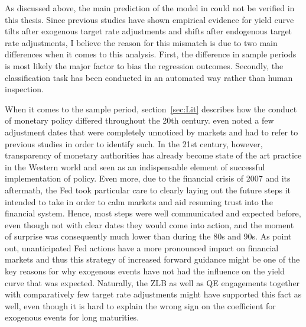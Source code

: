 
As discussed above, the main prediction of the model in \textcite{Ellingsen.2001} could not be verified in this thesis. Since previous studies have shown empirical evidence for yield curve tilts after exogenous target rate adjustments and shifts after endogenous target rate adjustments, I believe the reason for this mismatch is due to two main differences when it comes to this analysis. First, the difference in sample periods is most likely the major factor to bias the regression outcomes. Secondly, the classification task has been conducted in an automated way rather than human inspection.

When it comes to the sample period, section~\ref{sec:Lit} describes how the conduct of monetary policy differed throughout the 20th century. \textcite{Ellingsen.2003} even noted a few adjustment dates that were completely unnoticed by markets and had to refer to previous studies in order to identify such. In the 21st century, however, transparency of monetary authorities has already become state of the art practice in the Western world and seen as an indispensable element of successful implementation of policy. Even more, due to the financial crisis of 2007 and its aftermath, the Fed took particular care to clearly laying out the future steps it intended to take in order to calm markets and aid resuming trust into the financial system. Hence, most steps were well communicated and expected before, even though not with clear dates they would come into action, and the moment of surprise was consequently much lower than during the 80s and 90s. As \textcite{Ellingsen.2003} point out, unanticipated Fed actions have a more pronounced impact on financial markets and thus this strategy of increased forward guidance might be one of the key reasons for why exogenous events have not had the influence on the yield curve that was expected. Naturally, the ZLB as well as QE engagements together with comparatively few target rate adjustments might have supported this fact as well, even though it is hard to explain the wrong sign on the coefficient for exogenous events for long maturities. 

